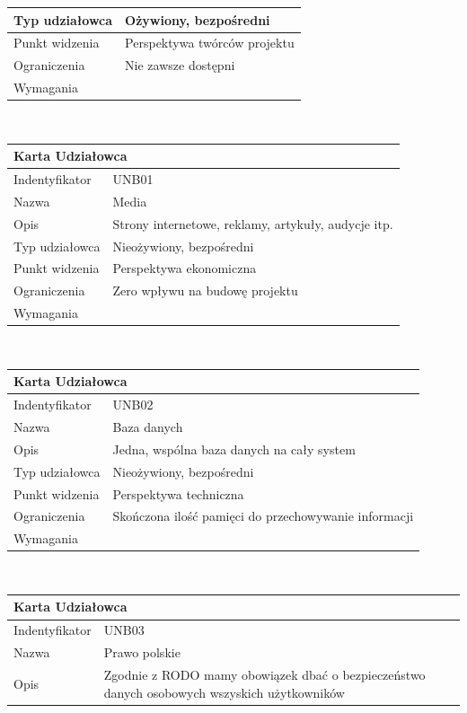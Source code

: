 \documentclass[a4paper,11pt]{report}
\begin{document}
\begin{itemize}
\begin{tabular}{|p{3cm}|p{11cm}|}
	\hline
	Typ udziałowca&Ożywiony, bezpośredni\\
	\hline
	Punkt widzenia&Perspektywa twórców projektu\\
	\hline
	Ograniczenia&Nie zawsze dostępni\\
	\hline
	Wymagania&\\
	\hline
	\end{tabular}\\
	\begin{tabular}{|p{3cm}|p{11cm}|}
	\hline
	\multicolumn{2}{|l|}{\textbf{Karta Udziałowca}}\\
	\hline
	Indentyfikator&UNB01\\
	\hline
	Nazwa&Media\\
	\hline
	Opis&Strony internetowe, reklamy, artykuły, audycje itp.\\
	\hline
	Typ udziałowca&Nieożywiony, bezpośredni\\
	\hline
	Punkt widzenia&Perspektywa ekonomiczna\\
	\hline
	Ograniczenia&Zero wpływu na budowę projektu\\
	\hline
	Wymagania&\\
	\hline
	\end{tabular}\\
	\begin{tabular}{|p{3cm}|p{11cm}|}
	\hline
	\multicolumn{2}{|l|}{\textbf{Karta Udziałowca}}\\
	\hline
	Indentyfikator&UNB02\\
	\hline
	Nazwa&Baza danych\\
	\hline
	Opis&Jedna, wspólna baza danych na cały system\\
	\hline
	Typ udziałowca&Nieożywiony, bezpośredni\\
	\hline
	Punkt widzenia&Perspektywa techniczna\\
	\hline
	Ograniczenia&Skończona ilość pamięci do przechowywanie informacji\\
	\hline
	Wymagania&\\
	\hline
	\end{tabular}\\
	\begin{tabular}{|p{3cm}|p{11cm}|}
	\hline
	\multicolumn{2}{|l|}{\textbf{Karta Udziałowca}}\\
	\hline
	Indentyfikator&UNB03\\
	\hline
	Nazwa&Prawo polskie\\
	\hline
	Opis&Zgodnie z RODO mamy obowiązek dbać o bezpieczeństwo danych osobowych wszyskich użytkowników\\

\end{tabular}
\end{itemize}
\end{document}
